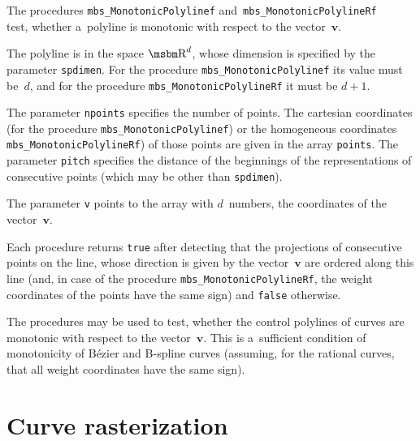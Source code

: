 \begin{sloppypar}
\hspace*{\parindent}The procedures \texttt{mbs\_MonotonicPolylinef}
and~\texttt{mbs\_MonotonicPolylineRf} \\
test, whether a~polyline is monotonic with respect to the vector~$\bm{v}$.
\end{sloppypar}

The polyline is in the space $\R^d$, whose dimension is specified
by the parameter \texttt{spdimen}. For the procedure
\texttt{mbs\_MonotonicPolylinef} its value must be~$d$, and for the procedure
\texttt{mbs\_MonotonicPolylineRf} it must be $d+1$.

The parameter \texttt{npoints} specifies the number of points. The cartesian
coordinates (for the procedure \texttt{mbs\_MonotonicPolylinef}) or the
homogeneous coordinates \texttt{mbs\_MonotonicPolylineRf}) of those points
are given in the array \texttt{points}. The parameter \texttt{pitch}
specifies the distance of the beginnings of the representations
of consecutive points (which may be other than \texttt{spdimen}).

The parameter \texttt{v} points to the array with $d$~numbers,
the coordinates of the vector~$\bm{v}$.

Each procedure returns \texttt{true} after detecting that the projections
of consecutive points on the line, whose direction is given by the
vector~$\bm{v}$ are ordered along this line
(and, in case of the procedure \texttt{mbs\_MonotonicPolylineRf},
the weight coordinates of the points have the same sign)
and \texttt{false} otherwise.

\vspace{\medskipamount}
The procedures may be used to test, whether the control polylines of
curves are monotonic with respect to the vector~$\bm{v}$. This is a~sufficient
condition of monotonicity of B\'{e}zier and B-spline curves
(assuming, for the rational curves, that all weight coordinates have the
same sign).


\newpage
\section{Curve rasterization}

